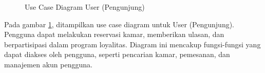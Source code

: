 \begin{figure}[H] %
    \centering
    \caption{Use Case Diagram User (Pengunjung)}
    \label{fig:ucd_user} %
\end{figure}

Pada gambar \ref{fig:ucd_user}, ditampilkan use case diagram untuk User (Pengunjung). Pengguna dapat melakukan reservasi kamar, memberikan ulasan, dan berpartisipasi dalam program loyalitas. Diagram ini mencakup fungsi-fungsi yang dapat diakses oleh pengguna, seperti pencarian kamar, pemesanan, dan manajemen akun pengguna.
